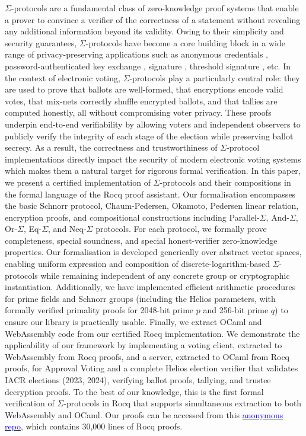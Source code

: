 \documentclass[sigconf, anonymous]{acmart}
\begin{document}
$\Sigma$-protocols are a fundamental class of zero-knowledge proof systems that enable a prover to convince a verifier of the correctness of a statement without revealing any additional information beyond its validity. Owing to their simplicity and security guarantees, $\Sigma$-protocols have become a core building block in a wide range of privacy-preserving applications such as anonymous credentials \cite{10.1145/2660267.2660328}, 
password-authenticated key exchange \cite{10.5555/2022815.2022838}, 
signature \cite{10.1007/0-387-34805-0_22}, threshold signature \cite{10.1007/978-3-030-81652-0_2}, etc. In the context of electronic voting, $\Sigma$-protocols play a particularly central role: they are used to prove that ballots are well-formed, that encryptions encode valid votes, that mix-nets correctly shuffle encrypted ballots, and that tallies are computed honestly, all without compromising voter privacy. These proofs underpin end-to-end verifiability by allowing voters and independent observers to publicly verify the integrity of each stage of the election while preserving ballot secrecy. As a result, the correctness and trustworthiness of $\Sigma$-protocol implementations directly impact the security of modern electronic voting systems which makes them a natural target for rigorous formal verification. In this paper, we present a certified implementation of $\Sigma$-protocols and their compositions in 
the formal language of the Rocq proof assistant. Our formalisation encompasses the basic Schnorr protocol, 
Chaum-Pedersen, Okamoto, Pedersen linear relation, encryption proofs, and compositional constructions including Parallel-$\Sigma$, 
And-$\Sigma$, Or-$\Sigma$, Eq-$\Sigma$, and Neq-$\Sigma$ protocols. For each protocol, we formally prove 
completeness, special soundness, and special honest-verifier zero-knowledge properties.
Our formalisation is developed 
generically over abstract vector spaces, enabling uniform expression and composition of discrete-logarithm-based 
$\Sigma$-protocols while remaining independent of any concrete group or cryptographic instantiation. Additionally, we have implemented efficient arithmetic procedures for prime fields and Schnorr groups (including the Helios parameters, 
with formally verified primality proofs for 2048-bit prime $p$ and 256-bit prime $q$) to 
ensure our library is practically usable. Finally, we extract OCaml and WebAssembly code from our certified 
Rocq implementation. We demonstrate the applicability of our framework by implementing a voting client, extracted to WebAssembly from Rocq proofs, and a server, extracted to OCaml from Rocq proofs, for Approval Voting and a complete Helios election verifier that validates IACR elections (2023, 2024), verifying ballot proofs, tallying, and trustee decryption proofs. To the best of our knowledge, this is the first formal verification of $\Sigma$-protocols in Rocq that supports simultaneous extraction to both WebAssembly and OCaml. Our proofs can be accessed from this \href{https://anonymous.4open.science/r/SigmaProtocol-EBA5/README.md}{\textcolor{blue}{anonymous repo}}, which contains 30,000 lines of Rocq proofs.
\end{document}
